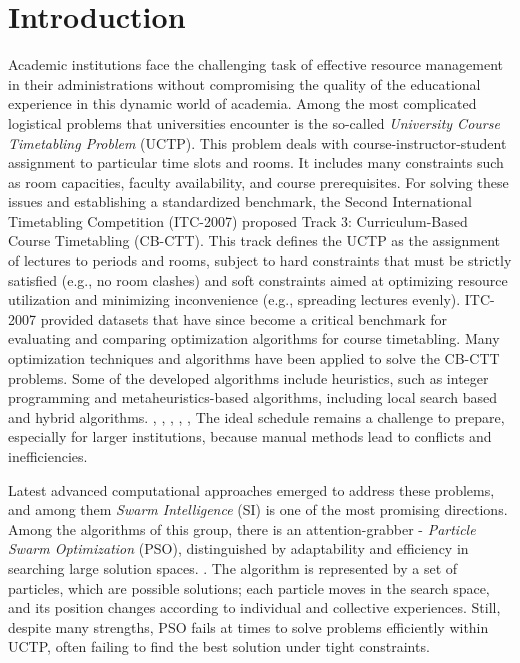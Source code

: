\section{Introduction}
\label{sec:introduction}

Academic institutions face the challenging task of effective resource management in their administrations without compromising the quality of the educational experience in this dynamic world of academia. \cite{Zhang2014-ak} Among the most complicated logistical problems that universities encounter is the so-called \textit{University Course Timetabling Problem} (UCTP). \cite{Arratia-Martinez2021-io} \cite{Oswald_C2013-zo} This problem deals with course-instructor-student assignment to particular time slots and rooms. It includes many constraints such as room capacities, faculty availability, and course prerequisites. \cite{Torres2021-ir} For solving these issues and establishing a standardized benchmark, the Second International Timetabling Competition (ITC-2007) proposed Track 3: Curriculum-Based Course Timetabling (CB-CTT). \cite{ITC2007-problem} This track defines the UCTP as the assignment of lectures to periods and rooms, subject to hard constraints that must be strictly satisfied (e.g., no room clashes) and soft constraints aimed at optimizing resource utilization and minimizing inconvenience (e.g., spreading lectures evenly). ITC-2007 provided datasets that have since become a critical benchmark for evaluating and comparing optimization algorithms for course timetabling. Many optimization techniques and algorithms have been applied to solve the CB-CTT problems. Some of the developed algorithms include heuristics, such as integer programming \cite{Lach2008-cbt} \cite{Burke2008-bcp} and metaheuristics-based algorithms, including local search based and hybrid algorithms. \cite{Bolaji2011-abc} \cite{Muller2007-itc} \cite{Abdullah2010-genetic}, \cite{Geiger2009-threshold}, \cite{Geiger2009-multicriteria}, \cite{Shaker2009-greatdeluge}, \cite{Lu2009-neighborhood}, \cite{Lu2010-adaptivetabu} The ideal schedule remains a challenge to prepare, especially for larger institutions, because manual methods lead to conflicts and inefficiencies.

Latest advanced computational approaches emerged to address these problems, and among them \textit{Swarm Intelligence} (SI) is one of the most promising directions. \cite{Algethami2021-mm} Among the algorithms of this group, there is an attention-grabber - \textit{Particle Swarm Optimization} (PSO), distinguished by adaptability and efficiency in searching large solution spaces. \cite{Chen2013-cp} \cite{Ali2014-mb}. The algorithm is represented by a set of particles, which are possible solutions; each particle moves in the search space, and its position changes according to individual and collective experiences.\cite{kennedy1995particle} \cite{Gunawan2008-ga} Still, despite many strengths, PSO fails at times to solve problems efficiently within UCTP, often failing to find the best solution under tight constraints. \cite{Oswald_C2013-zo}

